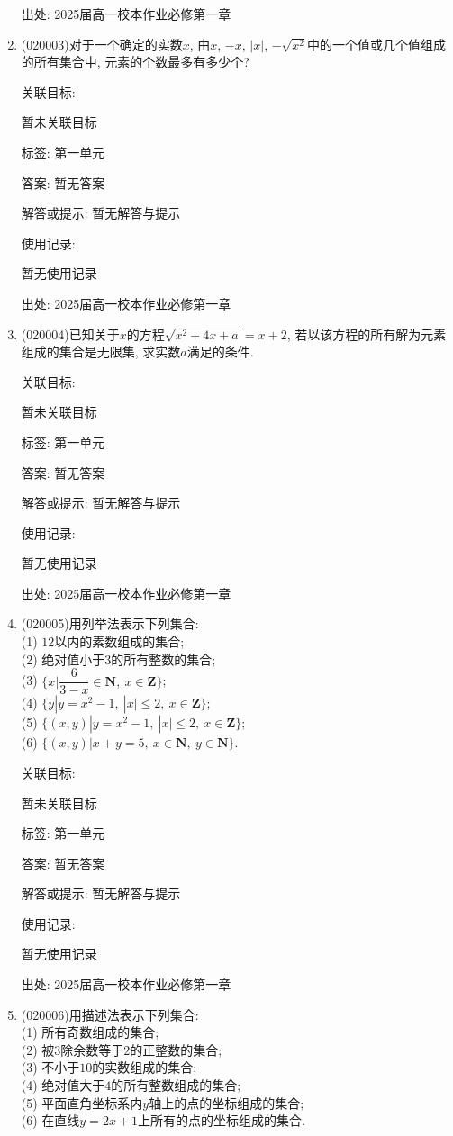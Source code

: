 \documentclass[10pt,a4paper]{article}
\begin{document}
\begin{enumerate}[1.]
出处: 2025届高一校本作业必修第一章
\item { (020003)}对于一个确定的实数$x$, 由$x$, $-x$, $|x|$, $-\sqrt{x^2}$中的一个值或几个值组成的所有集合中, 元素的个数最多有多少个?


关联目标:

暂未关联目标



标签: 第一单元

答案: 暂无答案

解答或提示: 暂无解答与提示

使用记录:

暂无使用记录


出处: 2025届高一校本作业必修第一章
\item { (020004)}已知关于$x$的方程$\sqrt {x^2+4x+a}=x+2$, 若以该方程的所有解为元素组成的集合是无限集, 求实数$a$满足的条件.


关联目标:

暂未关联目标



标签: 第一单元

答案: 暂无答案

解答或提示: 暂无解答与提示

使用记录:

暂无使用记录


出处: 2025届高一校本作业必修第一章
\item { (020005)}用列举法表示下列集合:\\
(1) $12$以内的素数组成的集合;\\
(2) 绝对值小于$3$的所有整数的集合;\\
(3) $\{x|\dfrac 6{3-x}\in\mathbf{N}, \ x\in\mathbf{Z}\}$;\\
(4) $\{y|y=x^2-1 , \ |x| \le 2, \ x\in\mathbf{Z}\}$;\\
(5) $\{( x,y)|y=x^2-1,\ |x|\le 2, \ x\in\mathbf{Z}\}$;\\
(6) $\{( x,y)|x +y=5, \ x\in\mathbf{N}, \ y\in\mathbf{N}\}$.


关联目标:

暂未关联目标



标签: 第一单元

答案: 暂无答案

解答或提示: 暂无解答与提示

使用记录:

暂无使用记录


出处: 2025届高一校本作业必修第一章
\item { (020006)}用描述法表示下列集合:\\
(1) 所有奇数组成的集合;\\
(2) 被$3$除余数等于$2$的正整数的集合;\\
(3) 不小于$10$的实数组成的集合;\\
(4) 绝对值大于$4$的所有整数组成的集合;\\
(5) 平面直角坐标系内$y$轴上的点的坐标组成的集合;\\
(6) 在直线$y=2x+1$上所有的点的坐标组成的集合.



\end{enumerate}
\end{document}
